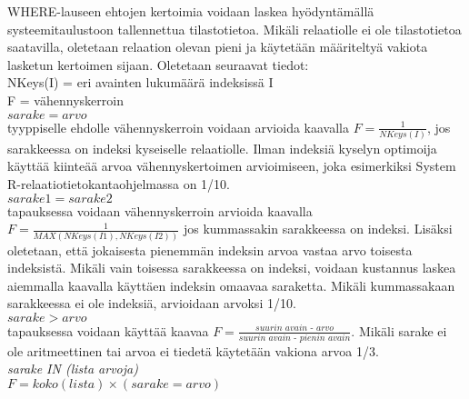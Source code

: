 \documentclass[finnish]{tktltiki2}
\theoremstyle{definition}
\theoremstyle{remark}
\begin{document}
WHERE-lauseen ehtojen kertoimia voidaan laskea hyödyntämällä systeemitaulustoon tallennettua tilastotietoa. Mikäli relaatiolle ei ole tilastotietoa saatavilla, oletetaan relaation olevan pieni ja käytetään määriteltyä vakiota lasketun kertoimen sijaan. \cite{selinger1979access} Oletetaan seuraavat tiedot: %
\\\newline
NKeys(I) = eri avainten lukumäärä indeksissä I
\\
F = vähennyskerroin
\\\newline
$sarake = arvo$ 
\\
tyyppiselle ehdolle vähennyskerroin voidaan arvioida kaavalla $F = \frac{1}{NKeys(I)}$, jos sarakkeessa on indeksi kyseiselle relaatiolle. \cite{selinger1979access} Ilman indeksiä kyselyn optimoija käyttää kiinteää arvoa vähennyskertoimen arvioimiseen, joka esimerkiksi System R-relaatiotietokantaohjelmassa on 1/10.
\\\newline
$sarake1 = sarake2$ 
\\
tapauksessa voidaan vähennyskerroin arvioida kaavalla $F = \frac{1}{MAX (NKeys(I1), NKeys(I2))}$ jos kummassakin sarakkeessa on indeksi. Lisäksi oletetaan, että jokaisesta pienemmän indeksin arvoa vastaa arvo toisesta indeksistä. Mikäli vain toisessa sarakkeessa on indeksi, 
voidaan kustannus laskea aiemmalla kaavalla käyttäen indeksin omaavaa saraketta. Mikäli kummassakaan sarakkeessa ei ole indeksiä, arvioidaan arvoksi 1/10.
\\\newline
$sarake > arvo$
\\
tapauksessa voidaan käyttää kaavaa $F = \frac{\textit{suurin avain - arvo}}{\textit{suurin avain - pienin avain}}$. Mikäli sarake ei ole aritmeettinen tai arvoa ei tiedetä käytetään vakiona arvoa 1/3.
\\\newline
\textit{sarake IN (lista arvoja)}
\\
$F = koko(lista) \times (sarake = arvo)$


\end{document}
